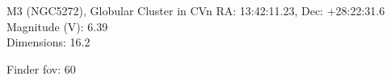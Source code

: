 \begin{block}{M3 (NGC5272), Globular Cluster in CVn}
    RA: 13:42:11.23, Dec: +28:22:31.6 \\ 
    Magnitude (V): 6.39 \\ 
    Dimensions: 16.2 

    Finder fov: 60 
\end{block}